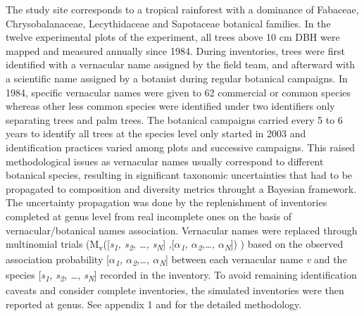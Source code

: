 \documentclass[fleqn,10pt]{ArtEcoFoG} %
\begin{document}
The study site corresponds to a tropical rainforest with a dominance of
Fabaceae, Chrysobalanaceae, Lecythidaceae and Sapotaceae botanical
families. In the twelve experimental plots of the experiment, all trees
above 10 cm DBH were mapped and measured annually since 1984. During
inventories, trees were first identified with a vernacular name assigned
by the field team, and afterward with a scientific name assigned by a
botanist during regular botanical campaigns. In 1984, specific
vernacular names were given to 62 commercial or common species whereas
other less common species were identified under two identifiers only
separating trees and palm trees. The botanical campaigns carried every 5
to 6 years to identify all trees at the species level only started in
2003 and identification practices varied among plots and successive
campaigns. This raised methodological issues as vernacular names usually
correspond to different botanical species, resulting in significant
taxonomic uncertainties that had to be propagated to composition and
diversity metrics throught a Bayesian framework. The uncertainty
propagation was done by the replenishment of inventories completed at
genus level from real incomplete ones on the basis of
vernacular/botanical names association. Vernacular names were replaced
through multinomial trials
(M\textsubscript{v}({[}\emph{s\textsubscript{1}, s\textsubscript{2},
\ldots{}, s\textsubscript{N}}{]} ,{[}\emph{\(\alpha\)\textsubscript{1},
\(\alpha\)\textsubscript{2},\ldots{}, \(\alpha\)\textsubscript{N}}{]}) )
based on the observed association probability
{[}\emph{\(\alpha\)\textsubscript{1},
\(\alpha\)\textsubscript{2},\ldots{}, \(\alpha\)\textsubscript{N}}{]}
between each vernacular name \emph{v} and the species
{[}\emph{s\textsubscript{1}, s\textsubscript{2}, \ldots{},
s\textsubscript{N}}{]} recorded in the inventory. To avoid remaining
identification caveats and consider complete inventories, the simulated
inventories were then reported at genus. See appendix 1 and
\citet{Aubry-Kientz2013} for the detailed methodology.
\end{document}
